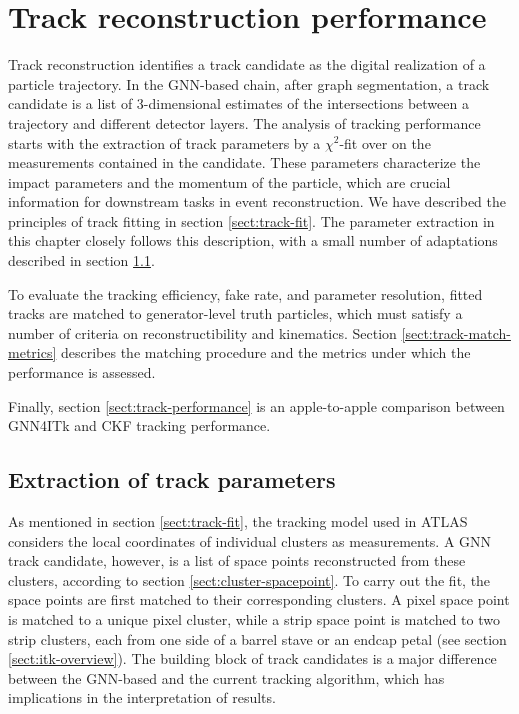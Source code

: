\chapter{Track reconstruction performance}
\label{chap:tracking-performance}
Track reconstruction identifies a track candidate as the digital realization of a particle trajectory. 
In the GNN-based chain, after graph segmentation, a track candidate is a list of 3-dimensional estimates of the intersections between a trajectory and different detector layers. 
The analysis of tracking performance starts with the extraction of track parameters by a $\chi^2$-fit over on the measurements contained in the candidate.
These parameters characterize the impact parameters and the momentum of the particle, which are crucial information for downstream tasks in event reconstruction. 
We have described the principles of track fitting in section \ref{sect:track-fit}.
The parameter extraction in this chapter closely follows this description, with a small number of adaptations described in section \ref{sect:chi2-fit}.

To evaluate the tracking efficiency, fake rate, and parameter resolution, fitted tracks are matched to generator-level truth particles, which must satisfy a number of criteria on reconstructibility and kinematics.
Section \ref{sect:track-match-metrics} describes the matching procedure and the metrics under which the performance is assessed.

Finally, section \ref{sect:track-performance} is an apple-to-apple comparison between GNN4ITk and CKF tracking performance.



\section{Extraction of track parameters}
\label{sect:chi2-fit}

As mentioned in section \ref{sect:track-fit}, the tracking model used in ATLAS considers the local coordinates of individual clusters as measurements.
A GNN track candidate, however, is a list of space points reconstructed from these clusters, according to section \ref{sect:cluster-spacepoint}. 
To carry out the fit, the space points are first matched to their corresponding clusters. 
A pixel space point is matched to a unique pixel cluster, while a strip space point is matched to two strip clusters, each from one side of a barrel stave or an endcap petal (see section \ref{sect:itk-overview}). 
The building block of track candidates is a major difference between the GNN-based and the current tracking algorithm, which has implications in the interpretation of results.

